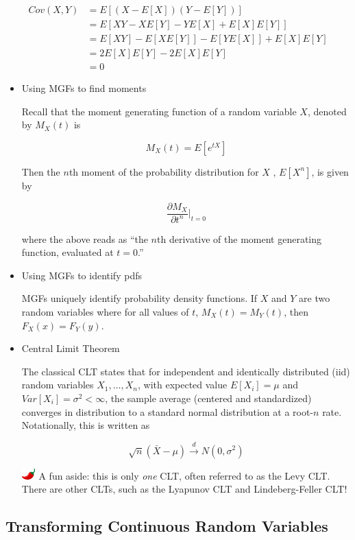 \documentclass[
  letterpaper,
  DIV=11,
  numbers=noendperiod]{scrreprt}
\begin{document}
\begin{align}
Cov(X, Y) & = E[(X - E[X])(Y - E[Y])] \\
& = E[XY - XE[Y] - YE[X] + E[X]E[Y]] \\
& = E[XY] - E[XE[Y]] - E[YE[X]] + E[X]E[Y] \\
& =  2E[X]E[Y] - 2E[X]E[Y] \\
& = 0
\end{align}

\begin{itemize}
\item
  Using MGFs to find moments

  Recall that the moment generating function of a random variable \(X\),
  denoted by \(M_X(t)\) is

  \[
  M_X(t) = E[e^{tX}]
  \]

  Then the \(n\)th moment of the probability distribution for \(X\) ,
  \(E[X^n]\), is given by

  \[
  \frac{\partial M_X}{\partial t^n} \Bigg|_{t = 0} 
  \]

  where the above reads as ``the \(n\)th derivative of the moment
  generating function, evaluated at \(t = 0\).''
\item
  Using MGFs to identify pdfs

  MGFs uniquely identify probability density functions. If \(X\) and
  \(Y\) are two random variables where for all values of \(t\),
  \(M_X(t) = M_Y(t)\), then \(F_X(x) = F_Y(y)\).
\item
  Central Limit Theorem

  The classical CLT states that for independent and identically
  distributed (iid) random variables \(X_1, \dots, X_n\), with expected
  value \(E[X_i] = \mu\) and \(Var[X_i] = \sigma^2 < \infty\), the
  sample average (centered and standardized) converges in distribution
  to a standard normal distribution at a root-\(n\) rate. Notationally,
  this is written as

  \[
  \sqrt{n} (\bar{X} - \mu) \overset{d}{\to} N(0, \sigma^2)
  \]

  \includegraphics[width=0.20833in,height=0.16667in]{images/chilipepper.png}
  A fun aside: this is only \emph{one} CLT, often referred to as the
  Levy CLT. There are other CLTs, such as the Lyapunov CLT and
  Lindeberg-Feller CLT!
\end{itemize}

\hypertarget{transforming-continuous-random-variables}{%
\subsection{Transforming Continuous Random
Variables}\label{transforming-continuous-random-variables}}
\end{document}
